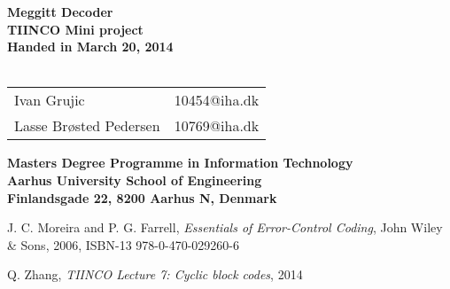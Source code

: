 \documentclass[a4paper,10pt]{report}
\begin{document}

\begin{titlepage}
\begin{center}
{\LARGE \textbf{Meggitt Decoder}}\\
{\large \textbf{TIINCO Mini project}}\\

\vspace{4cm}
\textbf{Handed in March 20, 2014}\\~\\ 
\begin{tabular}{ll}
Ivan Grujic & 10454@iha.dk \\
Lasse Brøsted Pedersen & 10769@iha.dk \\
\end{tabular}
\vfill
\textbf{Masters Degree Programme in Information Technology}\\
\textbf{Aarhus University School of Engineering}\\
\textbf{Finlandsgade 22, 8200 Aarhus N, Denmark}
\end{center}
\end{titlepage}

\setcounter{tocdepth}{1}
\tableofcontents

\listoffixmes













\begin{thebibliography}{9}

J. C. Moreira and P. G. Farrell, \emph{Essentials of Error-Control Coding}, John Wiley \& Sons, 2006,
ISBN-13 978-0-470-029260-6

Q. Zhang, \emph{TIINCO Lecture 7: Cyclic block codes}, 2014


\end{thebibliography}
\end{document}
